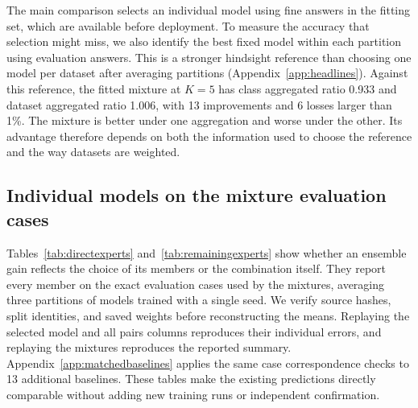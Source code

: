 The main comparison selects an individual model using fine answers in the fitting set,
which are available before deployment. To measure the accuracy that selection
might miss, we also identify the best fixed model within each partition using
evaluation answers. This is a stronger hindsight reference than choosing one
model per dataset after averaging partitions (Appendix~\ref{app:headlines}).
Against this reference, the fitted mixture at $K=5$ has class aggregated ratio
0.933 and dataset aggregated ratio 1.006, with 13 improvements and 6 losses
larger than 1\%. The mixture is better under one aggregation and worse under
the other. Its advantage therefore depends on both the information used to
choose the reference and the way datasets are weighted.

\subsection{Individual models on the mixture evaluation cases}
\label{app:individual}
Tables~\ref{tab:directexperts} and~\ref{tab:remainingexperts} show whether an
ensemble gain reflects the choice of its members or the combination itself.
They report every member on the exact evaluation cases used by the mixtures,
averaging three partitions of models trained with a single seed. We verify
source hashes, split identities, and saved weights before reconstructing the
means. Replaying the selected model and all pairs columns reproduces their
individual errors, and replaying the mixtures reproduces the reported summary.
Appendix~\ref{app:matchedbaselines} applies the same case correspondence checks
to 13 additional baselines. These tables make the existing predictions directly
comparable without adding new training runs or independent confirmation.

\begin{table}[h!]
\centering\footnotesize\setlength{\tabcolsep}{3pt}
\caption{\textbf{Individual direct models, part one.} Mean relative $L^2$ errors in
percent, averaged over the same three partitions as the mixtures. ``Tr.'' denotes
transfer. A dagger identifies the three entries excluded only in the sensitivity
analysis. Table~\ref{tab:perdataset} provides mixture errors on these cases. Imported Poisson II, Heat II, and Navier Stokes fields are from \citet{niu2024}.}
\label{tab:directexperts}
\end{table}

\begin{table}[h!]
\centering\footnotesize\setlength{\tabcolsep}{3pt}
\caption{\textbf{Individual direct models and predicted coarse correctors, part two.}
The protocol and percentage error units match Table~\ref{tab:directexperts}.
The POD GP uses HF training data only. Individual models are not retrained on
the additional examples used to fit the mixtures. Imported Poisson II, Heat II, and Navier Stokes fields are from \citet{niu2024}.}
\label{tab:remainingexperts}
\end{table}

